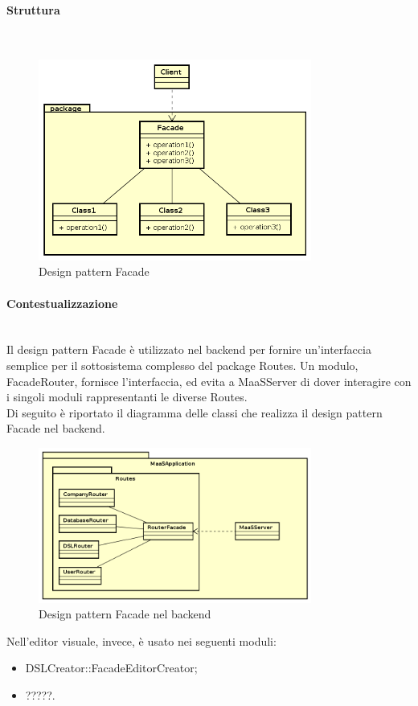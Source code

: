 \paragraph{Struttura} \mbox{} \\
\begin{figure}[H]
\centering
\includegraphics[width=0.8\textwidth]{res/sections/backend/facade.png}
\caption{Design pattern Facade}
\end{figure}
\paragraph{Contestualizzazione}\mbox{} \\
Il design pattern Facade è utilizzato nel backend per fornire un'interfaccia semplice per il sottosistema complesso del package Routes. Un modulo, FacadeRouter, fornisce l'interfaccia, ed evita a MaaSServer di dover interagire con i singoli moduli rappresentanti le diverse Routes. \\
Di seguito è riportato il diagramma delle classi che realizza il design pattern Facade nel backend.
\begin{figure}[H]
\centering
\includegraphics[width=0.8\textwidth]{res/sections/backend/facadeRoutes.png}
\caption{Design pattern Facade nel backend}
\end{figure}
Nell'editor visuale, invece, è usato nei seguenti moduli:
\begin{itemize}
\item DSLCreator::FacadeEditorCreator;
\item ?????.
\end{itemize}
